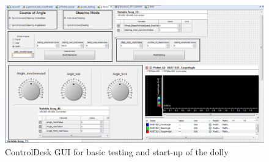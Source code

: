 \documentclass[ExampleMasters.tex]{subfiles}
\begin{document}
\begin{figure}[h]
	\centering
	\includegraphics[width=1\linewidth]{figures/CD_Layout}
	\caption{ControlDesk \gls{GUI} for basic testing and start-up of the dolly}	
	\label{fig:control_desk_GUI}
\end{figure}
\end{document}
